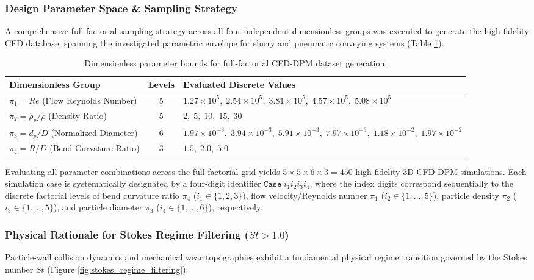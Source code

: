 \documentclass{article}
\begin{document}
\subsubsection{Design Parameter Space \& Sampling Strategy}
A comprehensive full-factorial sampling strategy across all four independent dimensionless groups was executed to generate the high-fidelity CFD database, spanning the investigated parametric envelope for slurry and pneumatic conveying systems (Table \ref{tab:parameter_space_bounds}).

\begin{table}[htpb]
\centering
\small
\caption{Dimensionless parameter bounds for full-factorial CFD-DPM dataset generation.}
\label{tab:parameter_space_bounds}
\begin{tabular}{l c l}
\toprule
\textbf{Dimensionless Group} & \textbf{Levels} & \textbf{Evaluated Discrete Values} \\
\midrule
$\pi_1 = Re$ (Flow Reynolds Number) & 5 & $1.27\times 10^5, \; 2.54\times 10^5, \; 3.81\times 10^5, \; 4.57\times 10^5, \; 5.08\times 10^5$ \\
$\pi_2 = \rho_p / \rho$ (Density Ratio) & 5 & $2, \; 5, \; 10, \; 15, \; 30$ \\
$\pi_3 = d_p / D$ (Normalized Diameter) & 6 & $1.97\times 10^{-3}, \; 3.94\times 10^{-3}, \; 5.91\times 10^{-3}, \; 7.97\times 10^{-3}, \; 1.18\times 10^{-2}, \; 1.97\times 10^{-2}$ \\
$\pi_4 = R / D$ (Bend Curvature Ratio) & 3 & $1.5, \; 2.0, \; 5.0$ \\
\bottomrule
\end{tabular}
\end{table}

Evaluating all parameter combinations across the full factorial grid yields $5 \times 5 \times 6 \times 3 = 450$ high-fidelity 3D CFD-DPM simulations. Each simulation case is systematically designated by a four-digit identifier $\texttt{Case}\;i_1 i_2 i_3 i_4$, where the index digits correspond sequentially to the discrete factorial levels of bend curvature ratio $\pi_4$ ($i_1 \in \{1,2,3\}$), flow velocity/Reynolds number $\pi_1$ ($i_2 \in \{1,\dots,5\}$), particle density $\pi_2$ ($i_3 \in \{1,\dots,5\}$), and particle diameter $\pi_3$ ($i_4 \in \{1,\dots,6\}$), respectively.

\subsubsection{Physical Rationale for Stokes Regime Filtering ($St > 1.0$)}
Particle-wall collision dynamics and mechanical wear topographies exhibit a fundamental physical regime transition governed by the Stokes number $St$ (Figure \ref{fig:stokes_regime_filtering}):
\end{document}
